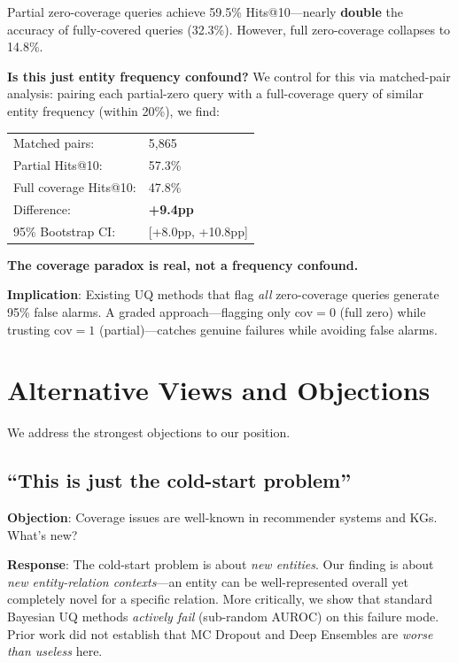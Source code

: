 \documentclass{article}
\begin{document}
Partial zero-coverage queries achieve 59.5\% Hits@10---nearly \textbf{double} the accuracy of fully-covered queries (32.3\%). However, full zero-coverage collapses to 14.8\%.

\textbf{Is this just entity frequency confound?} We control for this via matched-pair analysis: pairing each partial-zero query with a full-coverage query of similar entity frequency (within 20\%), we find:
\begin{center}
\begin{tabular}{ll}
Matched pairs: & 5,865 \\
Partial Hits@10: & 57.3\% \\
Full coverage Hits@10: & 47.8\% \\
Difference: & \textbf{+9.4pp} \\
95\% Bootstrap CI: & [+8.0pp, +10.8pp] \\
\end{tabular}
\end{center}

\textbf{The coverage paradox is real, not a frequency confound.}

\textbf{Implication}: Existing UQ methods that flag \emph{all} zero-coverage queries generate 95\% false alarms. A graded approach---flagging only $\text{cov}=0$ (full zero) while trusting $\text{cov}=1$ (partial)---catches genuine failures while avoiding false alarms.

\section{Alternative Views and Objections}
\label{sec:objections}

We address the strongest objections to our position.

\subsection{``This is just the cold-start problem''}

\textbf{Objection}: Coverage issues are well-known in recommender systems and KGs. What's new?

\textbf{Response}: The cold-start problem is about \emph{new entities}. Our finding is about \emph{new entity-relation contexts}---an entity can be well-represented overall yet completely novel for a specific relation. More critically, we show that standard Bayesian UQ methods \emph{actively fail} (sub-random AUROC) on this failure mode. Prior work did not establish that MC Dropout and Deep Ensembles are \emph{worse than useless} here.
\end{document}
